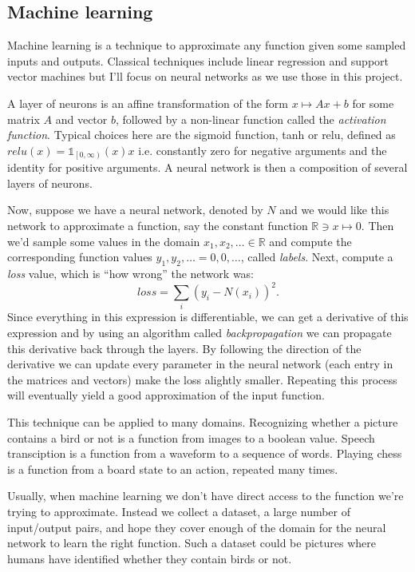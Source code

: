 \documentclass{article}
\theoremstyle{changedot}
\theoremstyle{changedotbreak}
\theoremstyle{nonumberplain}
\newcommand{\m}{\mathbb}
\begin{document}
\subsection{Machine learning}
Machine learning is a technique to approximate any function given some sampled inputs and outputs. Classical techniques include linear regression and support vector machines but I'll focus on neural networks as we use those in this project.

A layer of neurons is an affine transformation of the form $x \mapsto Ax + b$ for some matrix $A$ and vector $b$, followed by a non-linear function called the \emph{activation function}. Typical choices here are the sigmoid function, tanh or relu, defined as $relu(x) = \mathds{1}_{\left[0,\infty\right)}(x) x$ i.e. constantly zero for negative arguments and the identity for positive arguments. A neural network is then a composition of several layers of neurons.

Now, suppose we have a neural network, denoted by $N$ and we would like this network to approximate a function, say the constant function $\m R \ni x \mapsto 0$. Then we'd sample some values in the domain $x_{1}, x_{2}, \dots \in \m R$ and compute the corresponding function values $y_{1}, y_{2}, \dots = 0, 0, \dots$, called \emph{labels}. Next, compute a \emph{loss} value, which is ``how wrong'' the network was: \[loss = \sum_{i} (y_{i} - N(x_{i}))^{2}.\] Since everything in this expression is differentiable, we can get a derivative of this expression and by using an algorithm called \emph{backpropagation} we can propagate this derivative back through the layers. By following the direction of the derivative we can update every parameter in the neural network (each entry in the matrices and vectors) make the loss alightly smaller. Repeating this process will eventually yield a good approximation of the input function.

This technique can be applied to many domains. Recognizing whether a picture contains a bird or not is a function from images to a boolean value. Speech transciption is a function from a waveform to a sequence of words. Playing chess is a function from a board state to an action, repeated many times.

Usually, when machine learning we don't have direct access to the function we're trying to approximate. Instead we collect a dataset, a large number of input/output pairs, and hope they cover enough of the domain for the neural network to learn the right function. Such a dataset could be pictures where humans have identified whether they contain birds or not.
\end{document}
